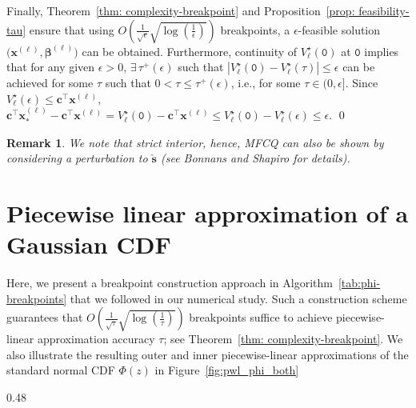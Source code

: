 \documentclass[opre,sglanonrev]{informs4}
\newtheorem{remark}{Remark}
\newcommand{\bbeta}{\bm{\beta}}
\newcommand{\bc}{\bm{c}}
\newcommand{\bs}{\bm{s}}
\newcommand{\bx}{\bm{x}}
\begin{document}
{\begin{APPENDICES}
Finally, Theorem~\ref{thm: complexity-breakpoint} and Proposition~\ref{prop: feasibility-tau} ensure that using $O(\frac{1} {\sqrt{\epsilon}} \sqrt{\log(\frac{1}{\epsilon})})$ breakpoints, a $\epsilon$-feasible solution $\bigl(\bx^{(\ell)}, \bbeta^{(\ell)}\bigr)$ can be obtained. Furthermore, continuity of $V^\star_\ell(\mathtt{0})$ at $\mathtt{0}$ implies that for any given $\epsilon > 0$, $\exists \, \tau^+(\epsilon)$ such that  $|V^\star_\ell(\mathtt{0}) - V^\star_\ell(\tau)| \leq \epsilon $ can be achieved for some $\tau$ such that $0 < \tau \leq \tau^+(\epsilon)$, i.e., for some $\tau \in (0, \epsilon]$. Since $V^\star_\ell(\epsilon) \leq \bc^\top \bx^{(\ell)}$, $\bc^\top \bx^{(\ell)}_* - \bc^\top \bx^{(\ell)}= V^\star_\ell(\mathtt{0}) - \bc^\top \bx^{(\ell)} \leq V^\star_\ell(\mathtt{0}) - V^\star_\ell(\epsilon) \leq \epsilon$. \hfill \qed
\begin{remark}
    We note that strict interior, hence, MFCQ can also be shown by considering a perturbation to $\check{\bs}$ (see Bonnans and Shapiro \cite{bonnans2013perturbation} for details).
\end{remark}



\section{Piecewise linear approximation of a Gaussian CDF}
Here, we present a breakpoint construction approach in Algorithm~\ref{tab:phi-breakpoints} that we followed in our numerical study. Such a construction scheme guarantees that $O(\frac{1} {\sqrt{\tau}} \sqrt{\log(\frac{1}{\tau})})$ breakpoints suffice to achieve piecewise-linear approximation accuracy \(\tau\); see Theorem~\ref{thm: complexity-breakpoint}. We also illustrate the resulting outer and inner piecewise-linear approximations of the standard normal CDF \(\Phi(z)\) in Figure~\ref{fig:pwl_phi_both}

\begin{table}[ht]
\scriptsize
  \centering
  \captionsetup{type=algorithm} %
  \caption{Breakpoints for approximating $\Phi(z)$}
  \label{tab:phi-breakpoints}

  \begin{subtable}[t]{0.48\linewidth}
  \vspace{-6pt}
    \centering
    \caption{\scriptsize Tangent approximation of $\Phi(z), z \ge 0$}
    \label{alg:breakpoint_find}
    \begin{algorithmic}[1]
      \Require{$\tau$}


\end{algorithmic}
\end{subtable}
\end{table}
\end{APPENDICES}}
\end{document}
